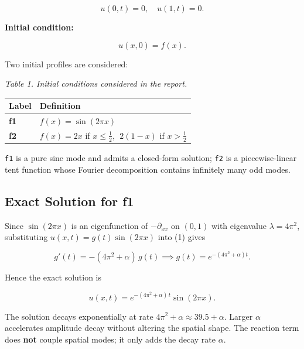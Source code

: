 \documentclass[11pt,a4paper]{article}
\begin{document}
\begin{equation}
u(0,t) = 0, \quad u(1,t) = 0. \tag{2}
\end{equation}

\textbf{Initial condition:}

\begin{equation}
u(x,0) = f(x). \tag{3}
\end{equation}

Two initial profiles are considered:

\emph{Table 1. Initial conditions considered in the report.}

\begin{center}
\renewcommand{\arraystretch}{1.15}
\begin{tabular}{|p{}|p{}|}
\hline
Label & Definition \\
\hline
\textbf{f1} & $f(x) = \sin(2\pi x)$ \\
\textbf{f2} & $f(x) = 2x$ if $x \le \tfrac{1}{2}$, $\; 2(1-x)$ if $x > \tfrac{1}{2}$ \\
\hline
\end{tabular}
\end{center}

\texttt{f1} is a pure sine mode and admits a closed-form solution; \texttt{f2} is a piecewise-linear tent function whose Fourier decomposition contains infinitely many odd modes.

\subsection{Exact Solution for f1}

Since $\sin(2\pi x)$ is an eigenfunction of $-\partial_{xx}$ on $(0,1)$ with eigenvalue $\lambda = 4\pi^2$, substituting $u(x,t) = g(t)\sin(2\pi x)$ into (1) gives

\begin{equation}
g'(t) = -(4\pi^2 + \alpha)\, g(t) \implies g(t) = e^{-(4\pi^2+\alpha)t}. \tag{4}
\end{equation}

Hence the exact solution is

\begin{equation}
{u(x,t) = e^{-(4\pi^2 + \alpha)\,t} \sin(2\pi x).} \tag{5}
\end{equation}

The solution decays exponentially at rate $4\pi^2 + \alpha \approx 39.5 + \alpha$. Larger $\alpha$ accelerates amplitude decay without altering the spatial shape. The reaction term does \textbf{not} couple spatial modes; it only adds the decay rate $\alpha$.
\end{document}

